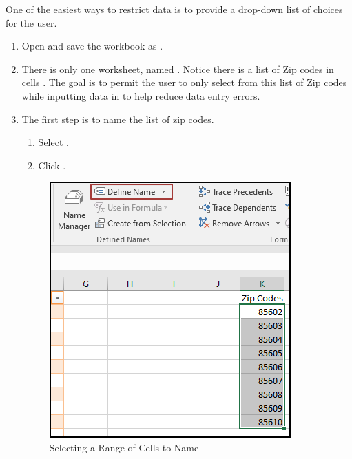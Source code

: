 One of the easiest ways to restrict data is to provide a drop-down list of choices for the user. 

\begin{enumbox}
	\begin{enumerate}
		\item Open 	and save the workbook as .
		\item There is only one worksheet, named . Notice there is a list of Zip codes in cells . The goal is to permit the user to only select from this list of Zip codes while inputting data in  to help reduce data entry errors.
		\item The first step is to name the list of zip codes.
		
		\begin{enumerate}
			\item Select .
			\item Click .
		\end{enumerate}
		
		\begin{figure}[H]
			\centering
			\includegraphics[width=\maxwidth{.75\linewidth}]{gfx/ch07_fig33}
			\caption{Selecting a Range of Cells to Name}
			\label{07:fig33}
		\end{figure}
		

\end{enumerate}
\end{enumbox}
